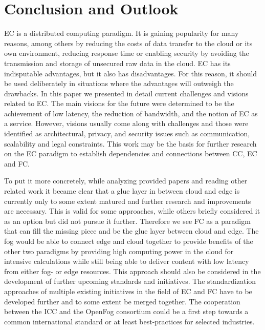\section{Conclusion and Outlook}\label{sec:conclusions}
EC is a distributed computing paradigm. It is gaining popularity for many reasons, among others by reducing the costs of data transfer to the cloud or its own environment, reducing response time or enabling security by avoiding the transmission and storage of unsecured raw data in the cloud. EC has its indisputable advantages, but it also has disadvantages. For this reason, it should be used deliberately in situations where the advantages will outweigh the drawbacks. 
In this paper we presented in detail current challenges and visions related to EC. The main visions for the future were determined to be the achievement of low latency, the reduction of bandwidth, and the notion of EC as a service. However, visions usually come along with challenges and those were identified as architectural, privacy, and security issues such as communication, scalability and legal constraints. This work may be the basis for further research on the EC paradigm to establish dependencies and connections between CC, EC and FC.

To put it more concretely, while analyzing provided papers and reading other related work it became clear that a glue layer in between cloud and edge is currently only to some extent matured and further research and improvements are necessary. This is valid for some approaches, while others briefly considered it as an option but did not pursue it further.
Therefore we see FC as a paradigm that can fill the missing piece and be the glue layer between cloud and edge.
The fog would be able to connect edge and cloud together to provide benefits of the other two paradigms by providing high computing power in the cloud for intensive calculations while still being able to deliver content with low latency from either fog- or edge resources.
This approach should also be considered in the development of further upcoming standards and initiatives. The standardization approaches of multiple existing initiatives in the field of EC and FC have to be developed further and to some extent be merged together. The cooperation between the ICC and the OpenFog consortium could be a first step towards a common international standard or at least best-practices for selected industries.